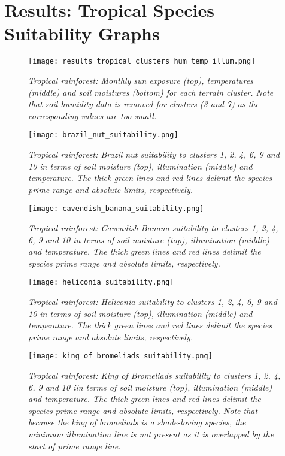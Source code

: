 \chapter{Results: Tropical Species Suitability Graphs} \label{AppendixI}

\begin{figure}[htb!]
\center
	\texttt{[image: results\_tropical\_clusters\_hum\_temp\_illum.png]}
	\caption{ \textit{Tropical rainforest: Monthly sun exposure (top), temperatures (middle) and soil moistures (bottom) for each terrain cluster. Note that soil humidity data is removed for clusters (3 and 7) as the corresponding values are too small.}}
	\label{fig:results_tropical_cluster_hum_temp_illum}
\end{figure}

\begin{figure}[htb!]
\center
	\texttt{[image: brazil\_nut\_suitability.png]}
	\caption{ \textit{Tropical rainforest: Brazil nut suitability to clusters 1, 2, 4, 6, 9 and 10 in terms of soil moisture (top), illumination (middle) and temperature. The thick green lines and red lines delimit the species prime range and absolute limits, respectively.} }
	\label{fig:results_tropical_brazil_nut_suitability}
\end{figure}

\begin{figure}[htb!]
\center
	\texttt{[image: cavendish\_banana\_suitability.png]}
	\caption{ \textit{Tropical rainforest: Cavendish Banana suitability to clusters 1, 2, 4, 6, 9 and 10 in terms of soil moisture (top), illumination (middle) and temperature. The thick green lines and red lines delimit the species prime range and absolute limits, respectively.}}
	\label{fig:results_tropical_cavendish_banana_suitability}
\end{figure}

\begin{figure}[htb!]
\center
	\texttt{[image: heliconia\_suitability.png]}
	\caption{\textit{Tropical rainforest: Heliconia suitability to clusters 1, 2, 4, 6, 9 and 10 in terms of soil moisture (top), illumination (middle) and temperature. The thick green lines and red lines delimit the species prime range and absolute limits, respectively.}}
	\label{fig:results_tropical_heliconia_suitability}
\end{figure}

\begin{figure}[htb!]
\center
	\texttt{[image: king\_of\_bromeliads\_suitability.png]}
	\caption{ \textit{Tropical rainforest: King of Bromeliads suitability to clusters 1, 2, 4, 6, 9 and 10 iin terms of soil moisture (top), illumination (middle) and temperature. The thick green lines and red lines delimit the species prime range and absolute limits, respectively. Note that because the king of bromeliads is a shade-loving species, the minimum illumination line is not present as it is overlapped by the start of prime range line.}}
	\label{fig:results_tropical_king_of_bromeliads_suitability}
\end{figure}


